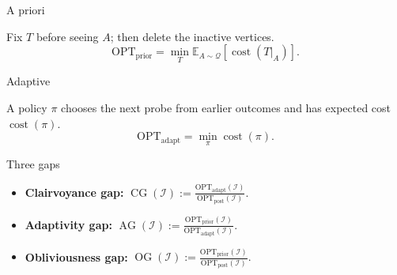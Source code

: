 \documentclass[aspectratio=169,12pt]{beamer}
\newcommand{\OPT}{\mathrm{OPT}}
\newcommand{\optpost}{\OPT_{\mathrm{post}}}
\newcommand{\optadapt}{\OPT_{\mathrm{adapt}}}
\newcommand{\optprior}{\OPT_{\mathrm{prior}}}
\newcommand{\E}{\mathbb{E}}
\newcommand{\cost}{\operatorname{cost}}
\begin{document}
\begin{frame}{A priori}
  \centering
  {\small\bfseries\color{ThTeal}
    \par}
  \smallskip
  \resizebox{0.82\linewidth}{!}{\ThPrioriExample}

  \medskip
  Fix \(T\) before seeing \(A\); then delete the inactive vertices.
  \[
    \optprior=\min_T\E_{A\sim\mathcal Q}
      \!\left[\cost(T\vert_A)\right].
  \]
\end{frame}

\begin{frame}{Adaptive}
  \centering
  {\small\bfseries
    \par}
  \smallskip
  \resizebox{0.82\linewidth}{!}{\ThProbeRealizations}
  \par\smallskip
  {\small\bfseries
    \par}

  \medskip
  A policy \(\pi\) chooses the next probe from earlier outcomes and has
  expected cost \(\cost(\pi)\).
  \[
    \optadapt=\min_\pi\cost(\pi).
  \]
\end{frame}

\begin{frame}{Three gaps}
  \centering
  \resizebox{0.78\linewidth}{!}{\ThGapArcs}

  \vspace{-0.05cm}
  \begin{itemize}\setlength{\itemsep}{0.40em}
    \item \textbf{\textcolor{ThTeal}{Clairvoyance gap:}}
      \(\displaystyle
        \operatorname{CG}(\mathcal I)
        :=\frac{\optadapt(\mathcal I)}{\optpost(\mathcal I)}.\)
    \item \textbf{\textcolor{ThBlue}{Adaptivity gap:}}
      \(\displaystyle
        \operatorname{AG}(\mathcal I)
        :=\frac{\optprior(\mathcal I)}{\optadapt(\mathcal I)}.\)
    \item \textbf{\textcolor{ThGold!80!ThInk}{Obliviousness gap:}}
      \(\displaystyle
        \operatorname{OG}(\mathcal I)
        :=\frac{\optprior(\mathcal I)}{\optpost(\mathcal I)}.\)
  \end{itemize}
\end{frame}
\end{document}
